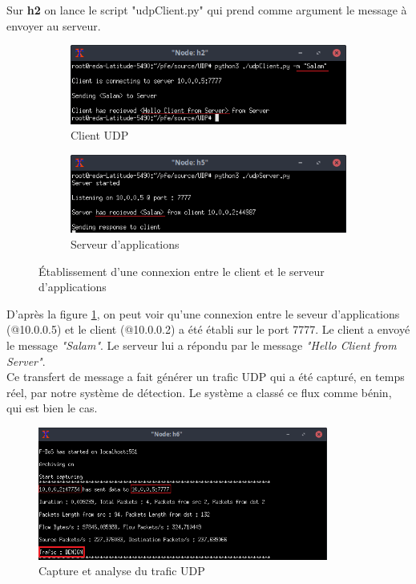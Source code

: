 Sur \textbf{h2} on lance le script "udpClient.py" qui prend comme argument le message à envoyer au serveur.
\begin{figure}[h]
\centering
\begin{subfigure}{12.5cm}
\centering
\includegraphics[width=\textwidth]{Figures/simulation/mininet/UDP/client/Benign}
\caption{Client UDP}
\end{subfigure}
\vskip 0.4cm
\begin{subfigure}{12.5cm}
\centering
\includegraphics[width=\textwidth]{Figures/simulation/mininet/UDP/server/benign_request}
\caption{Serveur d'applications}
\end{subfigure}
\vskip 0.3cm
\decoRule
\caption{Établissement d'une connexion entre le client et le serveur d'applications}
\label{fig:c/s_UDP}
\end{figure}
\newpage
D'après la figure \ref{fig:c/s_UDP}, on peut voir qu'une connexion entre le seveur d'applications (@10.0.0.5) et le client (@10.0.0.2) a été établi sur le port 7777. Le client a envoyé le message \textit{"Salam"}. Le serveur lui a répondu par le message \textit{"Hello Client from Server"}. \\
Ce transfert de message a fait générer un trafic UDP qui a été capturé, en temps réel, par notre système de détection. Le système a classé ce flux comme bénin, qui est bien le cas. 
\begin{figure}[h]
\centering
\includegraphics[width=0.85\textwidth]{Figures/simulation/mininet/IDS/benign_udp}
\decoRule
\caption{Capture et analyse du trafic UDP}
\label{fig:udpTraffic}
\end{figure}

